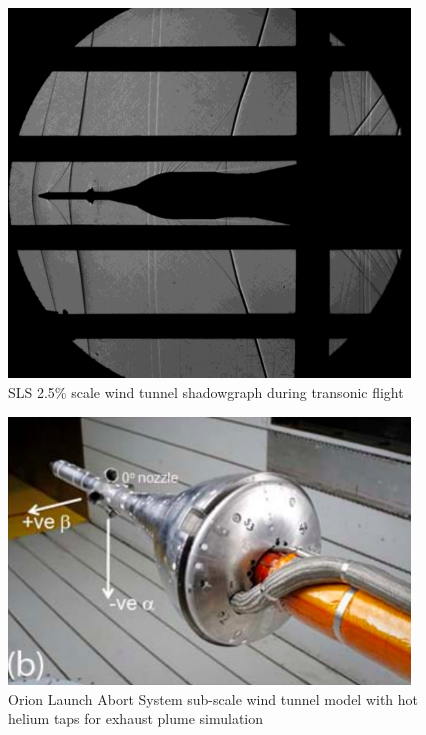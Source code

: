 \documentclass[]{aiaa-tc}%
\begin{document}
\begin{figure}[htb]
\begin{center}
\includegraphics[width=0.95\textwidth]{Images/SLS_WTT_Shadowgraph.png}
\caption{SLS 2.5\% scale wind tunnel shadowgraph during transonic flight\cite{SLSAscentWTT}}
\label{SLSWTTshadowgraph}
\end{center}
\end{figure}

\begin{figure}[htb]
\begin{center}
\includegraphics[width=0.95\textwidth]{Images/SLS_WTT_Abort_Model.png}
\caption{Orion Launch Abort System sub-scale wind tunnel model with hot helium taps for exhaust plume simulation \cite{HeatedHeliumWTT}}
\label{SLSWTTHeliumTaps}
\end{center}
\end{figure}
\end{document}
